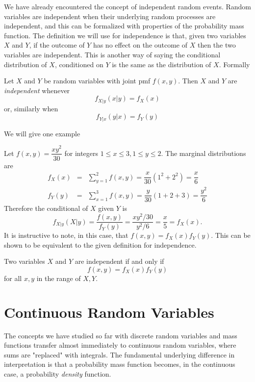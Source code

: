 \documentclass[../main.tex]{subfiles}
\begin{document}
We have already encountered the concept of independent random events. Random variables
are independent when their underlying random processes are independent, and this
can be formalized with properties of the probability mass function. The definition
we will use for independence is that, given two variables $X$ and $Y$, if the outcome
of $Y$ has no effect on the outcome of $X$ then the two variables are independent. 
This is another way of saying the conditional distribution of $X$, conditioned on $Y$
is the same as the distribution of $X$. Formally
\begin{definition}
	Let $X$ and $Y$ be random variables with joint pmf $f(x,y)$. Then $X$ and $Y$
	are \textit{independent} whenever
	$$f_{X|y}(x|y) = f_X(x)$$
	or, similarly when
	$$f_{Y|x}(y|x) = f_Y(y)$$
\end{definition}
We will give one example
\begin{example}
	Let $f(x,y) = \dfrac{xy^2}{30}$ for integers $1 \leq x \leq 3, 1\leq y \leq 2$. The marginal distributions are
	\begin{eqnarray*}
		f_X(x) &=& \sum_{y=1}^2 f(x,y) = \dfrac{x}{30}(1^2+2^2) = \dfrac{x}{6} \\
		f_Y(y) &=& \sum_{x=1}^3 f(x,y) = \dfrac{y}{30}(1+2+3) = \dfrac{y^2}{6}
	\end{eqnarray*}
	Therefore the conditional of $X$ given $Y$ is
	$$f_{X|y}(X|y) = \dfrac{f(x,y)}{f_{Y}(y)} = \dfrac{xy^2/30}{y^2/6} = \dfrac{x}{5} = f_X(x).$$
	It is instructive to note, in this case, that $f(x,y) = f_X(x)f_Y(y)$. This can be
	shown to be equivalent to the given definition for independence.
\end{example}
\begin{remark}
	Two variables $X$ and $Y$ are independent if and only if
	$$f(x,y) = f_X(x)f_Y(y)$$ for all $x,y$ in the range of $X,Y$.
\end{remark}
\section{Continuous Random Variables}
The concepts we have studied so far with discrete random variables and mass functions transfer
almost immediately to continuous random variables, where sums are "replaced" with integrals. The fundamental underlying difference in interpretation is that a probability mass function becomes, in the continuous case, a probability \textit{density} function.
\end{document}
